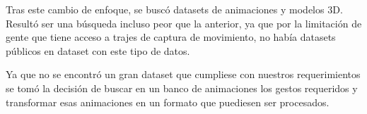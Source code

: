 Tras este cambio de enfoque, se buscó datasets de animaciones y modelos 3D. Resultó ser una búsqueda incluso peor que la anterior, ya que por la limitación de gente que tiene acceso a trajes de captura de movimiento, no había datasets públicos en dataset con este tipo de datos.

Ya que no se encontró un gran dataset que cumpliese con nuestros requerimientos se tomó la decisión de buscar en un banco de animaciones los gestos requeridos y transformar esas animaciones en un formato que puediesen ser procesados.